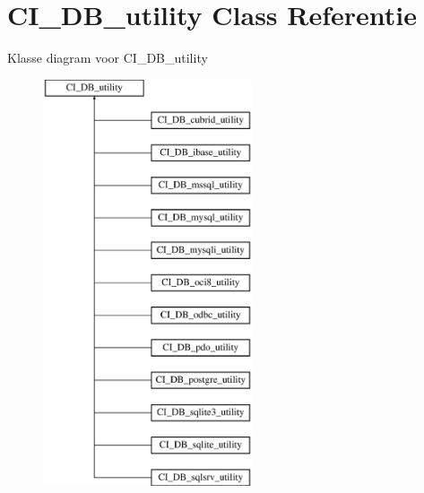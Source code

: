 \hypertarget{class_c_i___d_b__utility}{}\section{C\+I\+\_\+\+D\+B\+\_\+utility Class Referentie}
\label{class_c_i___d_b__utility}
Klasse diagram voor C\+I\+\_\+\+D\+B\+\_\+utility\begin{figure}[H]
\begin{center}
\leavevmode
\includegraphics[height=12.000000cm]{class_c_i___d_b__utility}
\end{center}
\end{figure}
